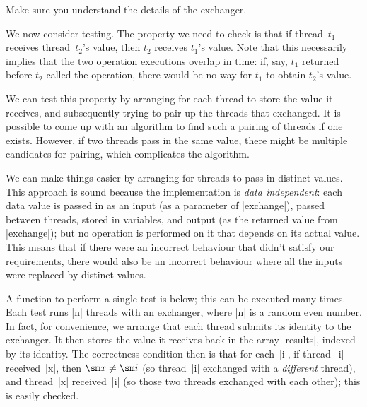 
\begin{instruction}
Make sure you understand the details of the exchanger.
\end{instruction}


We now consider testing.  The property we need to check is that
if thread~$t_1$ receives thread~$t_2$'s value, then $t_2$ receives $t_1$'s
value.  Note that this necessarily implies that the two operation executions
overlap in time: if, say, $t_1$ returned before $t_2$ called the operation,
there would be no way for $t_1$ to obtain $t_2$'s value.

We can test this property by arranging for each thread to store the value it
receives, and subsequently trying to pair up the threads that exchanged.  It
is possible to come up with an algorithm to find such a pairing of threads if
one exists.  However, if two threads pass in the same value, there might be
multiple candidates for pairing, which complicates the algorithm.

We can make things easier by arranging for threads to pass in distinct values.
This approach is sound because the implementation is \emph{data
  independent}: each data value is passed in as an
input (as a parameter of |exchange|), passed between threads, stored in
variables, and output (as the returned value from |exchange|); but no
operation is performed on it that depends on its actual value.  This means
that if there were an incorrect behaviour that didn't satisfy our
requirements, there would also be an incorrect behaviour where all the inputs
were replaced by distinct values.

A function to perform a single test is below; this can be executed many times.
Each test runs |n| threads with an exchanger, where |n| is a random even
number.  In fact, for convenience, we arrange that each thread submits its
identity to the exchanger.  It then stores the value it receives back in the
array |results|, indexed by its identity.  The correctness condition then is
that for each~|i|, if thread~|i| received~|x|, then $\sm x \ne \sm i$ (so
thread~|i| exchanged with a \emph{different} thread), and thread~|x|
received~|i| (so those two threads exchanged with each other); this is easily
checked.
%
\begin{mysamepage}
\end{mysamepage}

